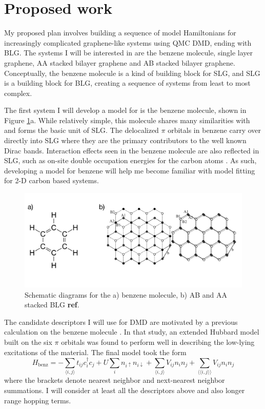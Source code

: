 \documentclass[12pt]{article}
\begin{document}
\section{Proposed work}
My proposed plan involves building a sequence of model Hamiltonians for increasingly complicated graphene-like systems using QMC DMD, ending with BLG.
The systems I will be interested in are the benzene molecule, single layer graphene, AA stacked bilayer graphene and AB stacked bilayer graphene.
Conceptually, the benzene molecule is a kind of building block for SLG, and SLG is a building block for BLG, creating a sequence of systems from least to most complex.

The first system I will develop a model for is the benzene molecule, shown in Figure \ref{fig:proposed}a.
While relatively simple, this molecule shares many similarities with and forms the basic unit of SLG.
The delocalized $\pi$ orbitals in benzene carry over directly into SLG where they are the primary contributors to the well known Dirac bands.
Interaction effects seen in the benzene molecule are also reflected in SLG, such as on-site double occupation energies for the carbon atoms \cite{Zheng2017, Wagner2015}.
As such, developing a model for benzene will help me become familiar with model fitting for 2-D carbon based systems.

\begin{figure}
\centering
\includegraphics[width=1.0\linewidth]{./figs/proposed.pdf}
\caption{Schematic diagrams for the a) benzene molecule, b) AB and AA stacked BLG \textbf{ref}.}
\label{fig:proposed}
\end{figure}

The candidate descriptors I will use for DMD are motivated by a previous calculation on the benzene molecule \cite{Wagner2015}.
In that study, an extended Hubbard model built on the six $\pi$ orbitals was found to perform well in describing the low-lying excitations of the material.
The final model took the form 
\begin{equation}
H_\text{benz} = -\sum_{\langle i,j \rangle} t_{ij}c_i^\dagger c_j + U \sum_i n_{i\uparrow}n_{i\downarrow}  + \sum_{\langle i,j \rangle}V_{ij} n_i n_j + \sum_{\langle \langle i,j \rangle\rangle}V_{ij} n_i n_j
\label{Hbenz}
\end{equation}
where the brackets denote nearest neighbor and next-nearest neighbor summations.
I will consider at least all the descriptors above and also longer range hopping terms.
\end{document}
